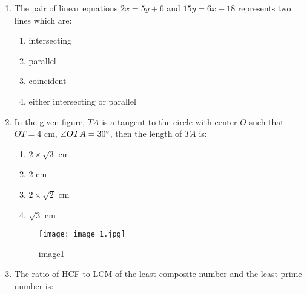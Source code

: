 \documentclass{article}
\begin{document}
\begin{enumerate}
    \item The pair of linear equations $2x = 5y + 6$ and $15y = 6x - 18$ represents two lines which are:
    \begin{enumerate}
        \item intersecting
        \item parallel
        \item coincident
        \item either intersecting or parallel
    \end{enumerate}
    
    \item In the given figure, $TA$ is a tangent to the circle with center $O$ such that $OT = 4$ cm, $\angle OTA = 30\degree$, then the length of $TA$ is:
    \begin{enumerate}
        \item $2 \times \sqrt{3}$ cm
        \item 2 cm
        \item $2 \times \sqrt{2}$ cm
        \item $\sqrt{3}$ cm
    \end{enumerate}
\begin{figure}[h!]
\centering
\texttt{[image: image 1.jpg]}
\label{fig:image1}
	\caption{image1}
\end{figure}

\item The ratio of HCF to LCM of the least composite number and the least prime number is:


\end{enumerate}
\end{document}
